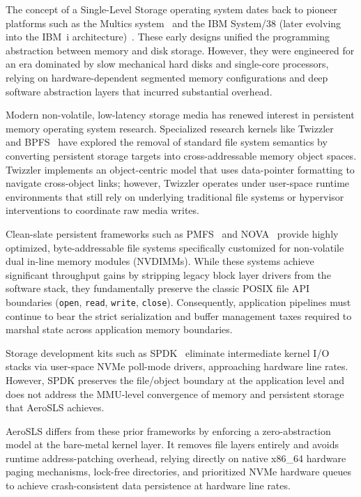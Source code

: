 \documentclass[sigconf]{acmart}
\begin{document}
The concept of a Single-Level Storage operating system dates
back to pioneer platforms such as the Multics
system~\cite{multics} and the IBM System/38 (later evolving into
the IBM~i architecture)~\cite{ibmi}.  These early designs
unified the programming abstraction between memory
and disk storage.  However, they were engineered for an era
dominated by slow mechanical hard disks and single-core
processors, relying on hardware-dependent segmented memory
configurations and deep software abstraction layers that
incurred substantial overhead.

Modern non-volatile, low-latency storage
media has renewed interest in persistent memory
operating system research.  Specialized research kernels like
Twizzler~\cite{twizzler} and BPFS~\cite{aurora} have explored
the removal of standard file system semantics by converting
persistent storage targets into cross-addressable memory object
spaces.  Twizzler implements an object-centric model that
uses data-pointer formatting to navigate cross-object links;
however, Twizzler operates under user-space runtime environments
that still rely on underlying traditional file systems or
hypervisor interventions to coordinate raw media writes.

Clean-slate persistent frameworks such as PMFS~\cite{pmfs} and
NOVA~\cite{nova} provide highly optimized, byte-addressable file
systems specifically customized for non-volatile dual in-line
memory modules (NVDIMMs).  While these systems achieve
significant throughput gains by stripping legacy block layer
drivers from the software stack, they fundamentally preserve
the classic POSIX file API boundaries (\texttt{open},
\texttt{read}, \texttt{write}, \texttt{close}).  Consequently,
application pipelines must continue to bear the strict
serialization and buffer management taxes required to marshal
state across application memory boundaries.

Storage development kits such as SPDK~\cite{spdk} eliminate
intermediate kernel I/O stacks via user-space NVMe poll-mode
drivers, approaching hardware line rates.  However, SPDK
preserves the file/object boundary at the application level and
does not address the MMU-level convergence of memory and
persistent storage that AeroSLS achieves.

AeroSLS differs from these prior frameworks by enforcing
a zero-abstraction model at the bare-metal kernel layer.
It removes file layers entirely and avoids runtime
address-patching overhead, relying directly on native x86\_64
hardware paging mechanisms, lock-free directories, and
prioritized NVMe hardware queues to achieve crash-consistent
data persistence at hardware line rates.
\end{document}
